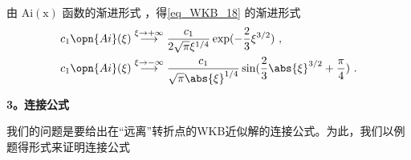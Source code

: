 由 $\mathrm{Ai(x)}$ 函数的渐进形式 ，得\autoref{eq_WKB_18} 的渐进形式
\begin{equation}\label{eq_WKB_22}
\begin{aligned}
&c_1\opn{Ai}(\xi) \overset{\xi \to +\infty}{\longrightarrow} \frac{c_1}{2\sqrt{\pi} \xi^{1/4}} \exp(-\frac{2}{3}\xi^{3/2})~,\\
&c_1\opn{Ai}(\xi) \overset{\xi \to -\infty}{\longrightarrow} \frac{c_1}{\sqrt{\pi} \abs{\xi}^{1/4}} \sin(\frac{2}{3}\abs{\xi}^{3/2}+\frac{\pi}{4})~.\\
\end{aligned}
\end{equation}

\textbf{3。连接公式}

我们的问题是要给出在“远离”转折点的WKB近似解的连接公式。为此，我们以例题得形式来证明连接公式
